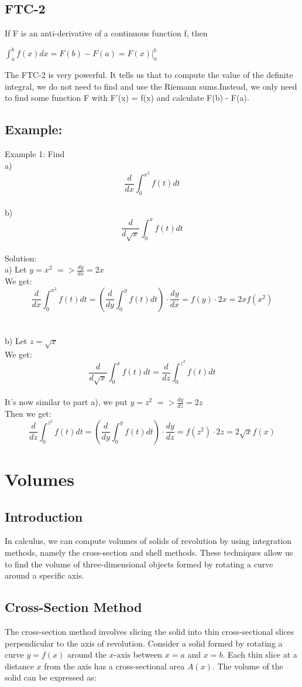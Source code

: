 \documentclass{article}
\begin{document}
\subsection{FTC-2}
If F is an anti-derivative of a continuous function f, then
\begin{mdframed}
    $\int_{a}^{b}f(x)dx = F(b) - F(a) = F(x) \bigg|_a^b $
\end{mdframed}
The FTC-2 is very powerful. It tells us that to compute the value of the definite integral, we do not need to find and use the Riemann sums.Instead, we only need to find some function F with F'(x) = f(x) and calculate F(b) - F(a).

\subsection{Example:}
Example 1: Find
\\
a) $$\frac{d}{dx} \int_0^{x^2}f(t)dt$$
\\
b) $$\frac{d}{d\sqrt{x}} \int_0^{x}f(t)dt$$
\\
Solution:
\\
a) 
Let $y = x^2$ $=> \frac{dy}{dx} = 2x$
\\
We get: $$\frac{d}{dx} \int_0^{x^2}f(t)dt = (\frac{d}{dy} \int_0^{y}f(t)dt) \cdot \frac{dy}{dx} = f(y) \cdot 2x = 2xf(x^2)$$
\\
\\
b)
Let $z = \sqrt{x}$
\\
We get: $$\frac{d}{d\sqrt{x}} \int_0^{x}f(t)dt = \frac{d}{dz} \int_0^{z^2}f(t)dt$$
\\
It's now similar to part a), we put $y = z^2$ $=> \frac{dy}{dz} = 2z $
\\
Then we get: $$\frac{d}{dz} \int_0^{z^2}f(t)dt = (\frac{d}{dy} \int_0^{y}f(t)dt) \cdot \frac{dy}{dz} = f(z^2) \cdot 2z = 2\sqrt{x}f(x)$$

\section{Volumes}
\subsection{Introduction}
In calculus, we can compute volumes of solids of revolution by using integration methods, namely the cross-section and shell methods. These techniques allow us to find the volume of three-dimensional objects formed by rotating a curve around a specific axis.

\subsection{Cross-Section Method}
The cross-section method involves slicing the solid into thin cross-sectional slices perpendicular to the axis of revolution. Consider a solid formed by rotating a curve $y = f(x)$ around the $x$-axis between $x = a$ and $x = b$. Each thin slice at a distance $x$ from the axis has a cross-sectional area $A(x)$. The volume of the solid can be expressed as:
\end{document}
